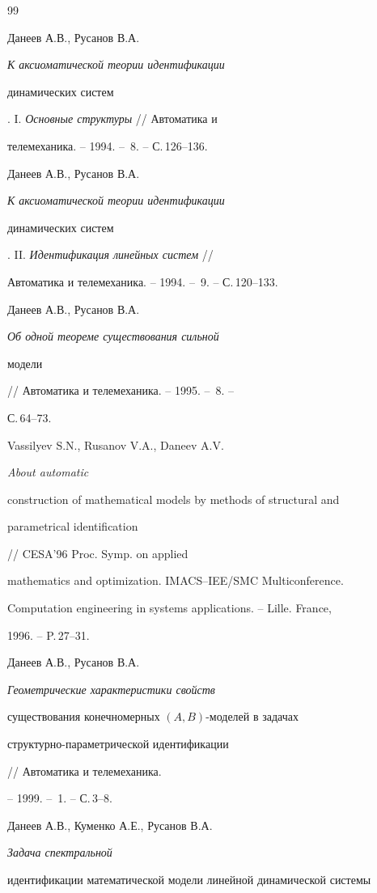 \begin{thebibliography}{99} 


 




Данеев А.В., Русанов В.А. {\em К аксиоматической теории идентификации 


динамических систем}. I. {\em Основные структуры} // Автоматика и 


телемеханика. -- 1994. -- \No\,8. -- С.\,126--136. 




Данеев А.В., Русанов В.А. {\em К аксиоматической теории идентификации 


динамических систем}. II. {\em Идентификация линейных систем} // 


Автоматика и телемеханика. -- 1994. -- \No\,9. -- С.\,120--133. 




Данеев А.В., Русанов В.А. {\em Об одной теореме существования сильной 


модели} // Автоматика и телемеханика. -- 1995. -- \No\,8. -- 


С.\,64--73. 




Vassilyev S.N., Rusanov V.A., Daneev A.V. {\em About automatic 


construction of mathematical models by methods of structural and 


parametrical identification} // CESA'96 Proc. Symp. on applied


mathematics and optimization. IMACS--IEE/SMC Multiconference. 


Computation engineering in systems applications. -- Lille. France, 


1996. -- P.\,27--31. 




Данеев А.В., Русанов В.А. {\em Геометрические характеристики свойств 


существования конечномерных $(A,B)$-моделей в задачах 


структурно-параметрической идентификации} // Автоматика и телемеханика. 


-- 1999. -- \No\,1. -- С.\,3--8. 




Данеев А.В., Куменко А.Е., Русанов В.А. {\em Задача спектральной 


идентификации математической модели линейной динамической системы 


}
\end{thebibliography}

